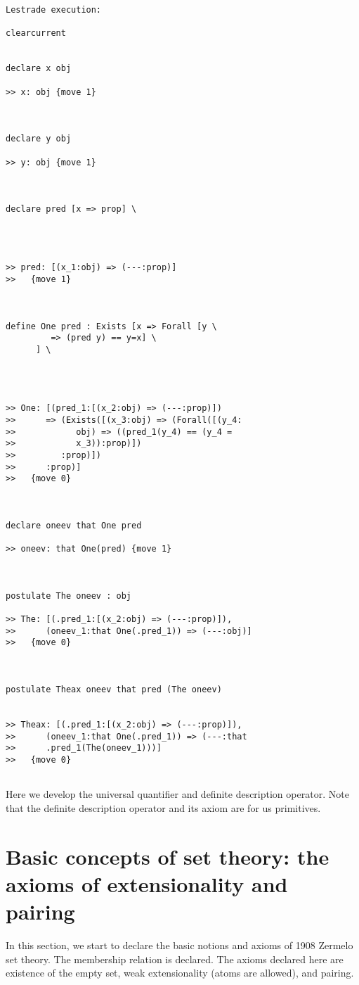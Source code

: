 \documentclass[12pt]{article}
\begin{document}
\begin{verbatim}Lestrade execution:

clearcurrent


declare x obj

>> x: obj {move 1}



declare y obj

>> y: obj {move 1}



declare pred [x => prop] \
   



>> pred: [(x_1:obj) => (---:prop)]
>>   {move 1}



define One pred : Exists [x => Forall [y \
         => (pred y) == y=x] \
      ] \
   



>> One: [(pred_1:[(x_2:obj) => (---:prop)])
>>      => (Exists([(x_3:obj) => (Forall([(y_4:
>>            obj) => ((pred_1(y_4) == (y_4 =
>>            x_3)):prop)])
>>         :prop)])
>>      :prop)]
>>   {move 0}



declare oneev that One pred

>> oneev: that One(pred) {move 1}



postulate The oneev : obj

>> The: [(.pred_1:[(x_2:obj) => (---:prop)]),
>>      (oneev_1:that One(.pred_1)) => (---:obj)]
>>   {move 0}



postulate Theax oneev that pred (The oneev)


>> Theax: [(.pred_1:[(x_2:obj) => (---:prop)]),
>>      (oneev_1:that One(.pred_1)) => (---:that
>>      .pred_1(The(oneev_1)))]
>>   {move 0}


\end{verbatim}

Here we develop the universal quantifier and definite description operator.  Note that the definite description operator and its axiom are for us primitives.



\section{Basic concepts of set theory:  the axioms of extensionality and pairing}

In this section, we start to declare the basic notions and axioms of 1908 Zermelo set theory.  The membership relation is declared.  The axioms declared here are existence of the empty set, weak extensionality (atoms are allowed), and pairing.
\end{document}
